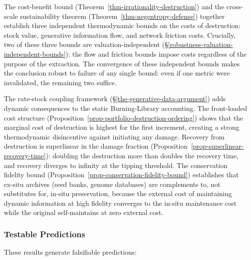 \documentclass[11pt]{article}
\theoremstyle{plain}
\theoremstyle{definition}
\theoremstyle{remark}
\let\origsubsubsection\subsubsection
\renewcommand{\subsubsection}{\needspace{4\baselineskip}\origsubsubsection}
\begin{document}
The cost-benefit bound (Theorem~\ref{thm-irrationality-destruction}) and
the cross-scale sustainability theorem
(Theorem~\ref{thm-negentropy-defense}) together establish three
independent thermodynamic bounds on the costs of destruction: stock
value, generative information flow, and network friction costs.
Crucially, two of these three bounds are valuation-independent
(§\ref{robustness-valuation-independent-bounds}): the flow and friction
bounds impose costs regardless of the purpose of the extraction. The
convergence of these independent bounds makes the conclusion robust to
failure of any single bound: even if one metric were invalidated, the
remaining two suffice.

The rate-stock coupling framework (§\ref{the-generative-data-argument})
adds dynamic consequences to the static Burning-Library accounting. The
front-loaded cost structure
(Proposition~\ref{prop-portfolio-destruction-ordering}) shows that the
marginal cost of destruction is highest for the first increment,
creating a strong thermodynamic disincentive against initiating any
damage. Recovery from destruction is superlinear in the damage fraction
(Proposition~\ref{prop-superlinear-recovery-time}): doubling the
destruction more than doubles the recovery time, and recovery diverges
to infinity at the tipping threshold. The conservation fidelity bound
(Proposition~\ref{prop-conservation-fidelity-bound}) establishes that
ex-situ archives (seed banks, genome databases) are complements to, not
substitutes for, in-situ preservation, because the external cost of
maintaining dynamic information at high fidelity converges to the
in-situ maintenance cost while the original self-maintains at zero
external cost.

\subsubsection{Testable Predictions}\label{testable-predictions-2}

These results generate falsifiable predictions:
\end{document}
